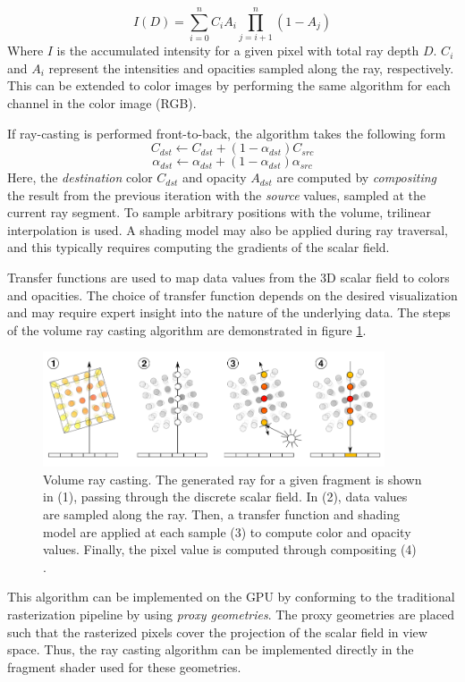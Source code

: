 \documentclass{article}
\begin{document}
$$ I(D) = \sum_{i=0}^n C_iA_i\prod_{j=i+1}^{n}(1-A_j)$$
Where $I$ is the accumulated intensity for a given pixel with total ray depth $D$.
$C_i$ and $A_i$ represent the intensities and opacities sampled along the ray, respectively. This
can be extended to color images by performing the same algorithm for each channel in the color image (RGB).

If ray-casting is performed front-to-back, the algorithm takes the following form \cite{Kruger2006GPU}
$$ C_{dst} \leftarrow C_{dst} + (1-\alpha_{dst})C_{src} $$
$$ \alpha_{dst} \leftarrow \alpha_{dst} + (1-\alpha_{dst})\alpha_{src}$$
Here, the \textit{destination} color $C_{dst}$ and opacity $A_{dst}$ are computed by 
\textit{compositing} the result from the previous iteration with the \textit{source} values, sampled at the current ray segment. To sample arbitrary positions with the volume, trilinear interpolation is used. A shading model may also be applied during ray traversal,
and this typically requires computing the gradients of the scalar field.

Transfer functions are used to map data values from the 3D scalar field to colors and opacities. The choice of transfer function
depends on the desired visualization and may require expert insight into the nature of the underlying data.
The steps of the volume ray casting algorithm are demonstrated in figure \ref{fig:volumeRayCasting}.


\newpage
\begin{figure}[tbh]
    \centering
    \includegraphics[width=0.9\textwidth]{images/Volume_ray_casting.png}
    \caption{Volume ray casting. The generated ray for a given fragment is shown in (1), passing through the discrete scalar field. In (2), data values are sampled along the ray. Then, a transfer function and shading model are applied at each sample (3) to compute color and opacity values. Finally, the pixel value
    is computed through compositing (4) \cite{Hofmann2011}.}
    \label{fig:volumeRayCasting}
\end{figure}

This algorithm can be implemented on the GPU by conforming to the traditional rasterization pipeline by using \textit{proxy geometries}.
The proxy geometries are placed such that the rasterized pixels cover the projection of the scalar field in view space. Thus,
the ray casting algorithm can be implemented directly in the fragment shader used for these geometries. 
\end{document}
